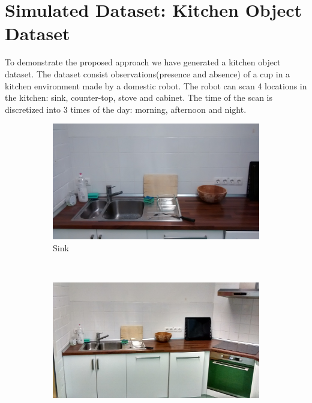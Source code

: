 \section{Simulated Dataset: Kitchen Object Dataset}

To demonstrate the proposed approach we have generated a kitchen object dataset. The dataset consist observations(presence and absence) of a cup in a kitchen environment made by a domestic robot. The robot can scan 4 locations in the kitchen: sink, counter-top, stove and cabinet. The time of the scan is discretized into 3 times of the day: morning, afternoon and night. 

\begin{figure}
    \centering
    \begin{subfigure}[b]{0.3\textwidth}
        \includegraphics[width=\textwidth]{images/sink.jpg}
        \caption{Sink}
        \label{fig:sink}
    \end{subfigure}
    ~ %
    \begin{subfigure}[b]{0.3\textwidth}
        \includegraphics[width=\textwidth]{images/stove.jpg}

\end{subfigure}
\end{figure}
